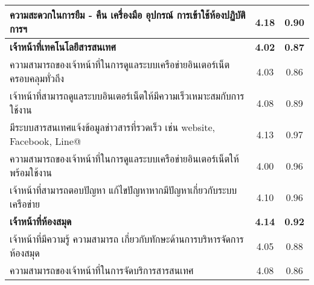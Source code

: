 \begin{longtable}{|>{\raggedright}p{9cm}|c|c|}
		ความสะดวกในการยืม - คืน เครื่องมือ อุปกรณ์ การเข้าใช้ห้องปฏิบัติการฯ                                                                                                          & 4.18                            & 0.90        \\ \hline
		\textbf{เจ้าหน้าที่เทคโนโลยีสารสนเทศ}                                                                                                                                         & \textbf{4.02}                            & \textbf{0.87}        \\ \hline
		ความสามารถของเจ้าหน้าที่ในการดูแลระบบเครือข่ายอินเตอร์เน็ตครอบคลุมทั่วถึง                                                                                                     & 4.03                            & 0.86        \\ \hline
		เจ้าหน้าที่สามารถดูแลระบบอินเตอร์เน็ตให้มีความเร็วเหมาะสมกับการใช้งาน                                                                                                         & 4.08                            & 0.89        \\ \hline
		มีระบบสารสนเทศแจ้งข้อมูลข่าวสารที่รวดเร็ว เช่น website, Facebook, Line@                                                                                                       & 4.13                            & 0.97        \\ \hline
		ความสามารถของเจ้าหน้าที่ในการดูแลระบบเครือข่ายอินเตอร์เน็ตให้พร้อมใช้งาน                                                                                                      & 4.00                            & 0.96        \\ \hline
		เจ้าหน้าที่สามารถตอบปัญหา แก้ไขปัญหาหากมีปัญหาเกี่ยวกับระบบเครือข่าย                                                                                                          & 4.10                            & 0.96        \\ \hline
		\textbf{เจ้าหน้าที่ห้องสมุด}                                                                                                                                                  & \textbf{4.14}                            & \textbf{0.92}        \\ \hline
		เจ้าหน้าที่มีความรู้ ความสามารถ เกี่ยวกับทักษะด้านการบริหารจัดการห้องสมุด                                                                                                     & 4.05                            & 0.88        \\ \hline
		ความสามารถของเจ้าหน้าที่ในการจัดบริการสารสนเทศ                                                                                                                                & 4.08                            & 0.86        \\ \hline

\end{longtable}
